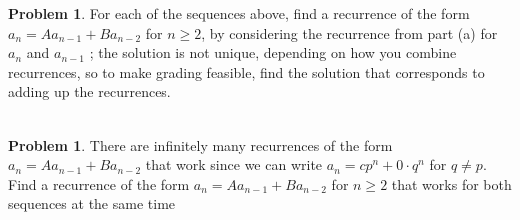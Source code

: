 \documentclass[10pt,leqno ]{article}
\theoremstyle{definition}
\newtheorem{problem}[theorem]{Problem}
\begin{document}
\begin{problem} For each of the sequences above, find a recurrence of the form $a_n=Aa_{n-1} + Ba_{n-2}$ for $n \geq 2$, by considering the recurrence from part (a) for $a_n$ and $a_{n-1}$ ; the solution is not unique,  depending on how you combine recurrences,  so to make grading feasible, find the solution that corresponds to adding up the recurrences.
\\\\
\Large
\end{problem}
\newpage

\begin{problem} There are infinitely many recurrences of the form $a_n=Aa_{n-1}+Ba_{n-2}$ that work since we can write $a_n=cp^n+ 0 \cdot q^n$ for $q \neq p$.  Find a recurrence of the form $a_n=Aa_{n-1}+Ba_{n-2}$ for $n \geq 2$ that works for both sequences at the same time
\\\\
\Large
\end{problem}
\newpage
\end{document}
